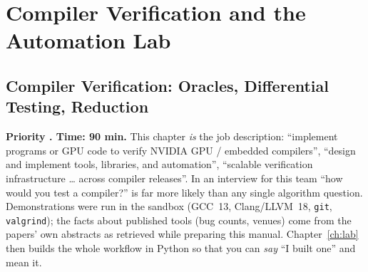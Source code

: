 \documentclass[10pt,a4paper,openany,oneside]{report}
\newcommand{\prio}[1]{\texorpdfstring{\ifcase#1\or{\color{gold}\ding{72}}\or{\color{gold}\ding{72}\ding{72}}\or{\color{gold}\ding{72}\ding{72}\ding{72}}\fi}{}}
\begin{document}
\part{Compiler Verification and the Automation Lab}

\chapter{Compiler Verification: Oracles, Differential Testing, Reduction}
\label{ch:verif}

\begin{chapbox}
\textbf{Priority \prio{3}. Time: 90 min.} This chapter \emph{is} the job description: ``implement programs or GPU code to verify NVIDIA GPU / embedded compilers'', ``design and implement tools, libraries, and automation'', ``scalable verification infrastructure \ldots{} across compiler releases''. In an interview for this team ``how would you test a compiler?'' is far more likely than any single algorithm question. Demonstrations were run in the sandbox (GCC~13, Clang/LLVM~18, \texttt{git}, \texttt{valgrind}); the facts about published tools (bug counts, venues) come from the papers' own abstracts as retrieved while preparing this manual. Chapter~\ref{ch:lab} then builds the whole workflow in Python so that you can \emph{say} ``I built one'' and mean it.
\end{chapbox}
\end{document}
